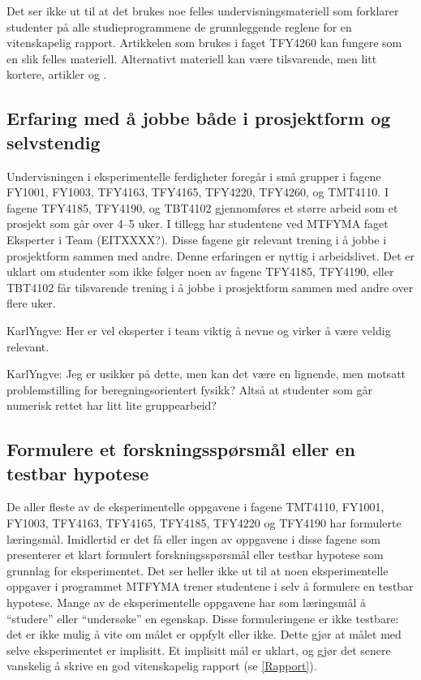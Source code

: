 \documentclass{article}
\begin{document}
Det ser ikke ut til at det brukes noe felles undervisningsmateriell som forklarer studenter på alle studieprogrammene de grunnleggende reglene for en vitenskapelig rapport. Artikkelen som brukes i faget TFY4260 kan fungere som en slik felles materiell. Alternativt materiell kan være tilsvarende, men litt kortere, artikler \cite{Lapin1994} og \cite{Senturia2003}.

\subsection{Erfaring med å jobbe både i prosjektform og selvstendig}
Undervisningen i eksperimentelle ferdigheter foregår i små grupper i fagene FY1001, FY1003, TFY4163, TFY4165, TFY4220, TFY4260, og TMT4110. I fagene TFY4185, TFY4190, og TBT4102 gjennomføres et større arbeid som et prosjekt som går over 4--5 uker. I tillegg har studentene ved MTFYMA faget Eksperter i Team (EITXXXX?). Disse fagene gir relevant trening i å jobbe i prosjektform sammen med andre. Denne erfaringen er nyttig i arbeidslivet.
Det er uklart om studenter som ikke følger noen av fagene TFY4185, TFY4190, eller TBT4102 får tilsvarende trening i å jobbe i prosjektform sammen med andre over flere uker.

{\color{red} KarlYngve: Her er vel eksperter i team viktig å nevne og virker å være veldig relevant.}


{\color{red} KarlYngve: Jeg er usikker på dette, men kan det være en lignende, men motsatt problemstilling for beregningsorientert fysikk? Altså at studenter som går numerisk rettet har litt lite gruppearbeid?}

\subsection{Formulere et forskningsspørsmål eller en testbar hypotese}
De aller fleste av de eksperimentelle oppgavene i fagene TMT4110, FY1001, FY1003, TFY4163, TFY4165, TFY4185, TFY4220 og TFY4190 har formulerte læringsmål. Imidlertid er det få eller ingen av oppgavene i disse fagene som presenterer et klart formulert forskningsspørsmål eller testbar hypotese som grunnlag for eksperimentet. Det ser heller ikke ut til at noen eksperimentelle oppgaver i programmet MTFYMA trener studentene i selv å formulere en testbar hypotese.
Mange av de eksperimentelle oppgavene har som læringsmål å ``studere'' eller ``undersøke'' en egenskap. Disse formuleringene er ikke testbare: det er ikke mulig å vite om målet er oppfylt eller ikke. Dette gjør at målet med selve eksperimentet er implisitt. Et implisitt mål er uklart, og gjør det senere vanskelig å skrive en god vitenskapelig rapport (se \cref{Rapport}).
\end{document}
